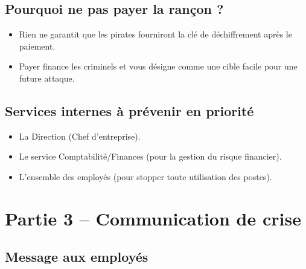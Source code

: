 \documentclass[a4paper,12pt]{article}
\begin{document}
\subsection*{Pourquoi ne pas payer la rançon ?}
\begin{itemize}
    \item Rien ne garantit que les pirates fourniront la clé de déchiffrement après le paiement.
    \item Payer finance les criminels et vous désigne comme une cible facile pour une future attaque.
\end{itemize}

\subsection*{Services internes à prévenir en priorité}
\begin{itemize}
    \item La Direction (Chef d'entreprise).
    \item Le service Comptabilité/Finances (pour la gestion du risque financier).
    \item L'ensemble des employés (pour stopper toute utilisation des postes).
\end{itemize}

\section{Partie 3 -- Communication de crise}

\subsection*{Message aux employés}

\begin{center}
\end{center}
\end{document}

